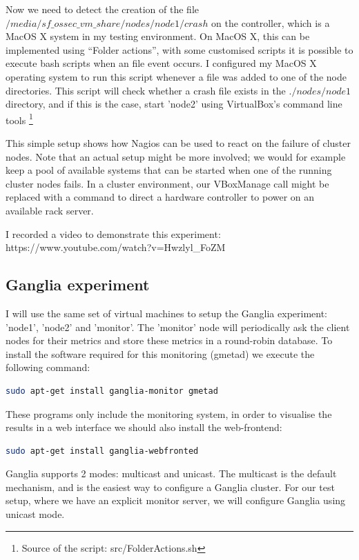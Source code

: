 \documentclass[12pt]{report}
\begin{document}
Now we need to detect the creation of the file \\
$/media/sf\_ossec\_vm\_share/nodes/node1/crash$  on the controller,
which is a MacOS X system in my testing environment. On MacOS X, this
can be implemented using ``Folder actions'', with some customised scripts
\cite{folder_actions_bash} it is possible to execute bash scripts when
an file event occurs.
I configured my MacOS X operating system to run this script whenever a
file was added to one of the node directories.
This script will check whether a crash file exists in the $./nodes/node1$
directory, and if this is the case, start 'node2' using VirtualBox's
command line tools \footnote{Source of the script: src/FolderActions.sh}

This simple setup shows how Nagios can be used to react on the failure
of cluster nodes. Note that an actual setup might be more
involved; we would for example keep a pool of available systems that
can be started when one of the running cluster nodes fails. In a
cluster environment, our VBoxManage call might be replaced with a
command to direct a hardware controller to power on an available rack
server.

I recorded a video to demonstrate this experiment:\\ 
https://www.youtube.com/watch?v=Hwzlyl\_FoZM
\\


\subsection{Ganglia experiment}
I will use the same set of virtual machines to setup the Ganglia
experiment: 'node1', 'node2' and 'monitor'.
The 'monitor' node will periodically ask the client nodes for their
metrics and store these metrics in a round-robin database.
To install the software required for this monitoring (gmetad) we execute the
following command:
\begin{lstlisting}[language=bash]
sudo apt-get install ganglia-monitor gmetad
\end{lstlisting} 

These programs only include the monitoring system, in order to
visualise the results in a web interface we should also install the
web-frontend:
\begin{lstlisting}[language=bash]
sudo apt-get install ganglia-webfronted
\end{lstlisting} 

Ganglia supports 2 modes: multicast and unicast.
The multicast is the default mechanism, and is the easiest way to
configure a Ganglia cluster.
For our test setup, where we have an explicit monitor server, we will
configure Ganglia using unicast mode.
\end{document}
